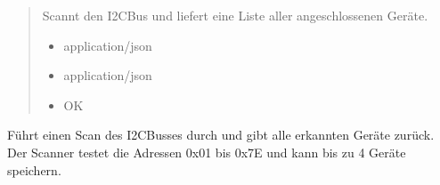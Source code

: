 \documentclass[letterpaper,10pt,english]{sphinxmanual}
\begin{document}
\begin{fulllineitems}
\label{\detokenize{agv_rest_api_i2c:get--api-agv-i2c-scan}}
\pysigstartsignatures
\pysigline
{}
\pysigstopsignatures\begin{quote}\begin{description}
\sphinxAtStartPar
Scannt den I2C\sphinxhyphen{}Bus und liefert eine Liste aller angeschlossenen Geräte.

\begin{itemize}
\item {} 
\sphinxAtStartPar
{} \textendash{} application/json

\end{itemize}

\begin{itemize}
\item {} 
\sphinxAtStartPar
{} \textendash{} application/json

\end{itemize}

\begin{itemize}
\item {} 
\sphinxAtStartPar
{} \textendash{} OK

\end{itemize}

\end{description}\end{quote}

\end{fulllineitems}


\sphinxAtStartPar
{}
Führt einen Scan des I2C\sphinxhyphen{}Busses durch und gibt alle erkannten Geräte zurück.
Der Scanner testet die Adressen 0x01 bis 0x7E und kann bis zu 4 Geräte speichern.

\sphinxAtStartPar
{}
\end{document}
